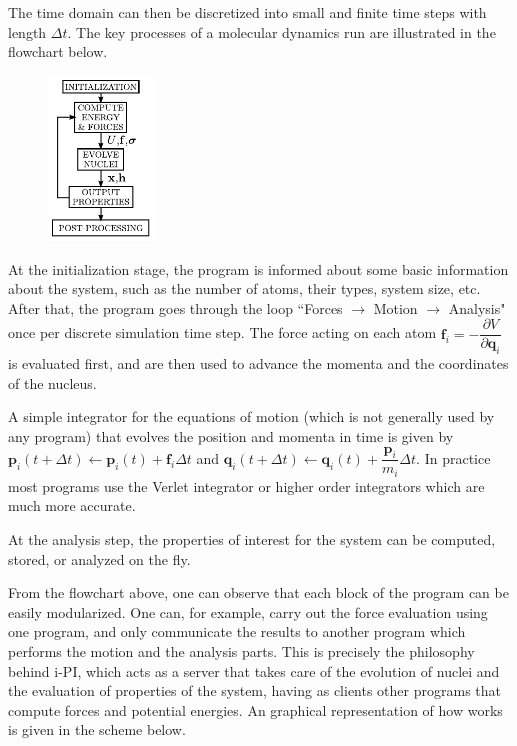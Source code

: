 \documentclass{article}
\begin{document}
\begin{Exercise}[label={basic},title={Molecular Dynamics simulations doing in a different way:  server and clients}]
The time domain can then be discretized into small  and finite time steps with length $\Delta t$.
The key processes of a molecular dynamics run are illustrated in the flowchart below.
\begin{figure}[h]
    \begin{center}
    \includegraphics[width=0.25\textwidth]{mdchart.pdf}
    \end{center}
\end{figure}
At the initialization stage, the program is informed about some basic information about the system,
such as the number of atoms, their types, system size, etc.
After that, the program goes through the loop ``Forces $\rightarrow$ Motion $\rightarrow$ Analysis" once per discrete simulation time step.
The force acting on each atom $\textbf{f}_i=-\dfrac{\partial V}{\partial \textbf{q}_i}$ is evaluated first,
and are then used to advance the momenta and the coordinates of the nucleus. 

A simple integrator for the equations of motion (which is not generally used by any program) that
evolves the position and momenta in time is given by
$\textbf{p}_i(t+\Delta t)\leftarrow \textbf{p}_i(t)+\textbf{f}_i \Delta t$ and 
$\textbf{q}_i(t+\Delta t)\leftarrow \textbf{q}_i(t)+\dfrac{\textbf{p}_i}{m_i} \Delta t$. In practice most
programs use the Verlet integrator or higher order integrators which are much more accurate.

At the analysis step, the properties of interest for the system can be computed, stored, or analyzed on the fly.

From the flowchart above, one can observe that each block of the program can be easily modularized.
One can, for example, carry out the force evaluation using one program,
and only communicate the results to another program which performs the motion and the analysis parts.
This is precisely the philosophy behind i-PI,
which acts as a server that takes care of the evolution of nuclei and the evaluation of
properties of the system, having as clients other programs that compute forces and potential energies.
An graphical representation of how \ipi{} works is given in the scheme below.


\end{Exercise}
\end{document}

